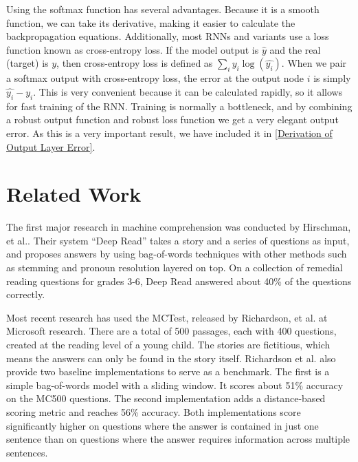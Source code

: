 \documentclass[pageno]{jpaper}
\begin{document}
Using the softmax function has several advantages. Because it is a smooth
function, we can take its derivative, making it easier to calculate the
backpropagation equations. Additionally, most RNNs and variants use a loss
function known as cross-entropy loss. If the model output is $\hat{y}$ and the
real (target) is $y$, then cross-entropy loss is defined as $\sum_i y_i
\log(\hat{y_{i}})$. When we pair a softmax output with cross-entropy loss, the
error at the output node $i$ is simply $\hat{y_i} - y_i$. This is very
convenient because it can be calculated rapidly, so it allows for fast training
of the RNN. Training is normally a bottleneck, and by combining a robust output
function and robust loss function we get a very elegant output error. As this is
a very important result, we have included it in \ref{Derivation of Output Layer
Error}.

\section{Related Work}
\label{Related Work}

The first major research in machine comprehension was conducted by Hirschman,
et al.\cite{Hirschman1999}. Their system ``Deep Read'' takes a story and a
series of questions as input, and proposes answers by using bag-of-words
techniques with other methods such as stemming and pronoun resolution layered
on top. On a collection of remedial reading questions for grades 3-6, Deep Read
answered about 40\% of the questions correctly.

Most recent research has used the MCTest\cite{Richardson2013}, released by
Richardson, et al. at Microsoft research. There are a total of 500 passages,
each with 400 questions, created at the reading level of a young child. The
stories are fictitious, which means the answers can only be found in the story
itself. Richardson et al. also provide two baseline implementations to serve as
a benchmark. The first is a simple bag-of-words model with a sliding window. It
scores about 51\% accuracy on the MC500 questions. The second implementation
adds a distance-based scoring metric and reaches 56\% accuracy. Both
implementations score significantly higher on questions where the answer is
contained in just one sentence than on questions where the answer requires
information across multiple sentences.
\end{document}
